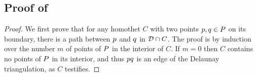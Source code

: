 \documentclass[12pt]{article}%
\begin{document}
\subsection{Proof of }

%
{%
   \ClaimDelConnected{} }

\begin{proof}
    We first prove that for any homothet $C$ with two points
    $p,q\in P$ on its boundary, there is a path between $p$
    and $q$ in $\mathcal{D} \cap {C}$.  The proof is by induction over
    the number $m$ of points of $P$ in the interior of $C$.  If
    $m=0$ then $C$ contains no points of $P$ in its interior, and
    thus $p q$ is an edge of the Delaunay triangulation, as $C$
    testifies.


\end{proof}
\end{document}
